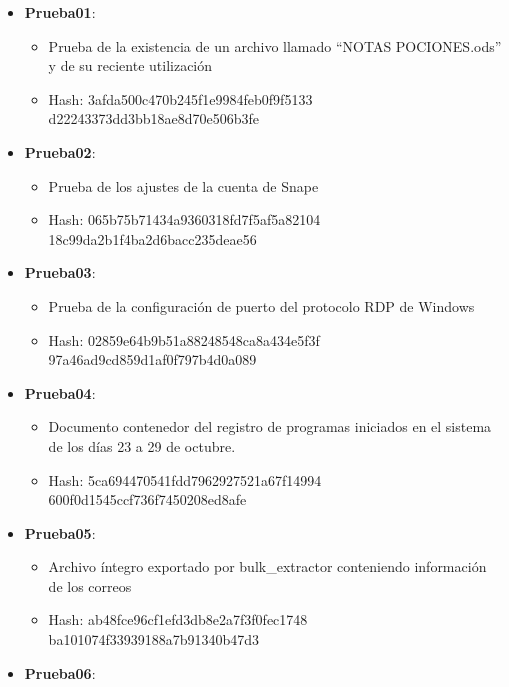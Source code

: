 \begin{itemize}
  \item{\textbf{Prueba01}: 
    \begin{itemize}
      \item{Prueba de la existencia de un archivo llamado ``NOTAS POCIONES.ods'' y de su reciente utilización}
      \item{Hash}: 3afda500c470b245f1e9984feb0f9f5133\\d22243373dd3bb18ae8d70e506b3fe
    \end{itemize}}
  \item{\textbf{Prueba02}: 
    \begin{itemize}
      \item{Prueba de los ajustes de la cuenta de Snape}
      \item{Hash}: 065b75b71434a9360318fd7f5af5a82104\\18c99da2b1f4ba2d6bacc235deae56
    \end{itemize}}
  \item{\textbf{Prueba03}: 
    \begin{itemize}
      \item{Prueba de la configuración de puerto del protocolo RDP de Windows}
      \item{Hash}: 02859e64b9b51a88248548ca8a434e5f3f\\97a46ad9cd859d1af0f797b4d0a089
    \end{itemize}}
  \item{\textbf{Prueba04}: 
    \begin{itemize}
      \item{Documento contenedor del registro de programas iniciados en el sistema de los días 23 a 29 de octubre.}
      \item{Hash}: 5ca694470541fdd7962927521a67f14994\\600f0d1545ccf736f7450208ed8afe
    \end{itemize}}
  \item{\textbf{Prueba05}: 
    \begin{itemize}
      \item{Archivo íntegro exportado por bulk\_extractor conteniendo información de los correos}
      \item{Hash}: ab48fce96cf1efd3db8e2a7f3f0fec1748\\ba101074f33939188a7b91340b47d3
    \end{itemize}}
  \item{\textbf{Prueba06}: 
    \begin{itemize}

\end{itemize}}
\end{itemize}
